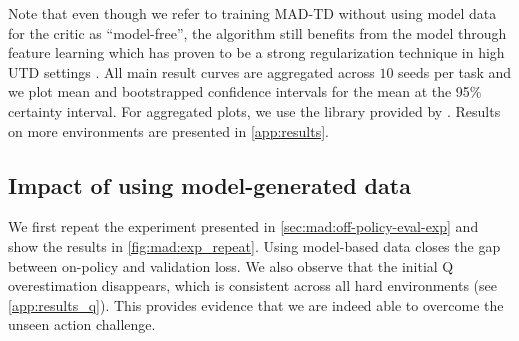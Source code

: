 Note that even though we refer to training MAD-TD without using model data for the critic as ``model-free'', the algorithm still benefits from the model through feature learning which has proven to be a strong regularization technique in high UTD settings \parencite{schwarzer2023bigger}.
All main result curves are aggregated across $10$ seeds per task and we plot mean and bootstrapped confidence intervals for the mean at the 95\% certainty interval.
For aggregated plots, we use the library provided by \textcite{agarwal2021deep}.
Results on more environments are presented in \autoref{app:results}.

\subsection{Impact of using model-generated data}

We first repeat the experiment presented in \autoref{sec:mad:off-policy-eval-exp} and show the results in \autoref{fig:mad:exp_repeat}.
Using model-based data closes the gap between on-policy and validation loss.
We also observe that the initial Q overestimation disappears, which is consistent across all hard environments (see \autoref{app:results_q}).
This provides evidence that we are indeed able to overcome the unseen action challenge.

